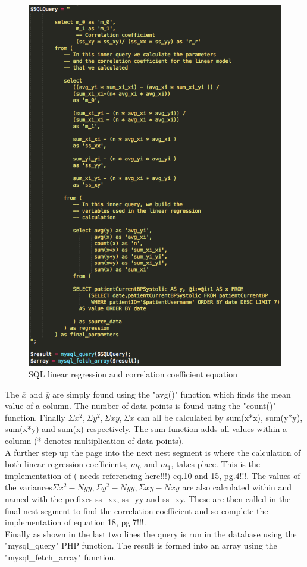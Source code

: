 \documentclass[11pt]{article}
\begin{document}
\begin{figure}
\centering
\includegraphics[scale=0.4]{mainSQL.png}
\caption{\label{DB3} SQL linear regression and correlation coefficient equation \cite{Mike}} 
\end{figure} 
The $\overline{x}$ and $\overline{y}$ are simply found using the "avg()" function which finds the mean value of a column. The number of data points is found using the "count()" function. Finally $\Sigma x^2, \Sigma y^2, \Sigma xy, \Sigma x$ can all be calculated by sum(x*x), sum(y*y), sum(x*y) and sum(x) respectively. The sum function adds all values within a column (* denotes multiplication of data points). 
\\ \indent
A further step up the page into the next nest segment is where the calculation of both linear regression coefficients, $m_0$ and $m_1$, takes place. This is the implementation of ({\color{red} needs referencing here!!!}) eq.10 and 15, pg.4!!!. The values of the variances$\Sigma x^2 -N\overline{y}\overline{y}, \Sigma y^2 - N\overline{y}\overline{y}, \Sigma xy - N\overline{x}\overline{y}$ are also calculated within and named with the prefixes ss\_xx, ss\_yy and ss\_xy. These are then called in the final nest segment to find the correlation coefficient and so complete the implementation of equation 18, pg 7!!!.
\\ \indent
Finally as shown in the last two lines the query is run in the database using the "mysql\_query" PHP function. The result is formed into an array using the "mysql\_fetch\_array" function. 
\end{document}
